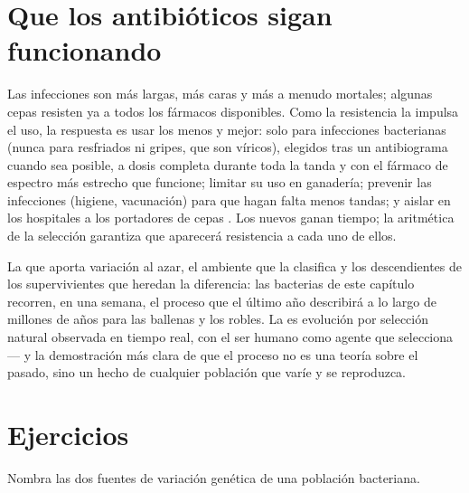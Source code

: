 \section{Que los antibióticos sigan funcionando}

\begin{proposition}\label{prop:g11:antibiotic-resistance:consequences}
Las infecciones  son más largas, más caras y más a menudo
mortales; algunas cepas resisten ya a todos los fármacos disponibles.
Como la resistencia la impulsa el uso, la respuesta es usar los
 menos y mejor: solo para infecciones bacterianas (nunca
para resfriados ni gripes, que son víricos), elegidos tras un
antibiograma cuando sea posible, a dosis completa durante toda la
tanda y con el fármaco de espectro más estrecho que funcione; limitar
su uso en ganadería; prevenir las infecciones (higiene, vacunación)
para que hagan falta menos tandas; y aislar en los hospitales a los
portadores de cepas . Los  nuevos ganan tiempo;
la aritmética de la selección garantiza que aparecerá resistencia a
cada uno de ellos.
\end{proposition}
\admitted

\begin{remark}\label{rem:g11:antibiotic-resistance:evolution}
La  que aporta variación al azar, el ambiente que la clasifica
y los descendientes de los supervivientes que heredan la diferencia:
las bacterias de este capítulo recorren, en una semana, el proceso que
el último año describirá a lo largo de millones de años para las
ballenas y los robles. La  es evolución
por selección natural observada en tiempo real, con el ser humano como
agente que selecciona --- y la demostración más clara de que el proceso
no es una teoría sobre el pasado, sino un hecho de cualquier población
que varíe y se reproduzca.
\end{remark}

\section{Ejercicios}

\begin{exercise}[$\star$]\label{exo:g11:antibiotic-resistance:1}
Nombra las dos fuentes de variación genética de una población
bacteriana.
\end{exercise}


